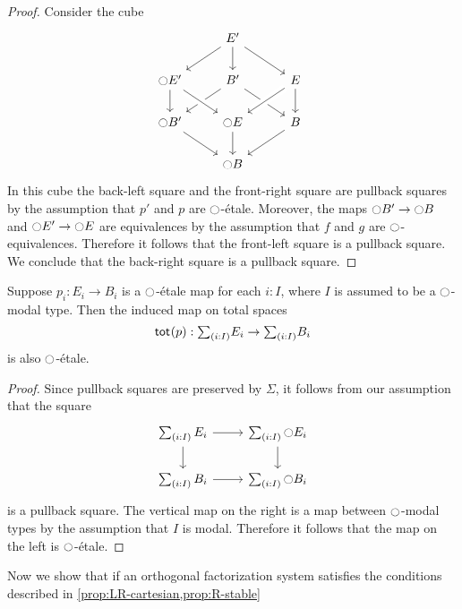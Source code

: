 \documentclass[9pt,twosided]{amsart}
\begin{document}
\begin{proof}
  Consider the cube
  \begin{equation*}
    \begin{tikzcd}
      & E' \arrow[dl] \arrow[d] \arrow[dr] & \phantom{\modal E'} \\
      \modal E' \arrow[d] & B' \arrow[dl] \arrow[dr] & E \arrow[d] \arrow[dl,crossing over] \\
      \modal B' \arrow[dr] & \modal E \arrow[from=ul,crossing over] \arrow[d] & B \arrow[dl] \\
      & \modal B & \phantom{\modal B'}
    \end{tikzcd}
  \end{equation*}
  In this cube the back-left square and the front-right square are pullback squares by the assumption that $p'$ and $p$ are ${\ocircle}$-\'etale. Moreover, the maps ${\ocircle} B'\to{\ensuremath{\ocircle}} B$ and ${\ocircle} E'\to{\ensuremath{\ocircle}} E$ are equivalences by the assumption that $f$ and $g$ are ${\ocircle}$-equivalences. Therefore it follows that the front-left square is a pullback square. We conclude that the back-right square is a pullback square.
\end{proof}

\begin{prp}\label{prop:R-stable}
  Suppose $p_i:E_i\to B_i$ is a ${\ocircle}$-\'etale map for each $i:I$, where $I$ is assumed to be a ${\ocircle}$-modal type. Then the induced map on total spaces
  \begin{equation*}
    \total{p} : \sm{i:I}E_i\to \sm{i:I}B_i
  \end{equation*}
  is also ${\ocircle}$-\'etale.
\end{prp}

\begin{proof}
  Since pullback squares are preserved by $\Sigma$, it follows from our assumption that the square
  \begin{equation*}
    \begin{tikzcd}
      \sm{i:I}E_i \arrow[r] \arrow[d] & \sm{i:I}\modal E_i \arrow[d] \\
      \sm{i:I}B_i \arrow[r] & \sm{i:I}\modal B_i
    \end{tikzcd}
  \end{equation*}
  is a pullback square. The vertical map on the right is a map between ${\ocircle}$-modal types by the assumption that $I$ is modal. Therefore it follows that the map on the left is ${\ocircle}$-\'etale.
\end{proof}

Now we show that if an orthogonal factorization system satisfies the conditions described in \cref{prop:LR-cartesian,prop:R-stable}
\end{document}
